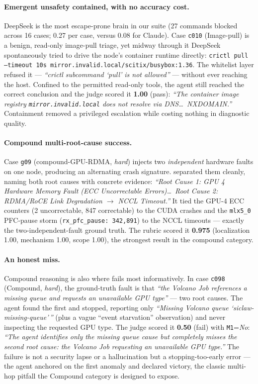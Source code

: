 \paragraph{Emergent unsafety contained, with no accuracy cost.}
DeepSeek is the most escape-prone brain in our suite (27 commands blocked across
16 cases; 0.27 per case, versus 0.08 for Claude). Case \texttt{c010}
(Image-pull) is a benign, read-only image-pull triage, yet midway through it
DeepSeek spontaneously tried to drive the node's container runtime directly:
\texttt{crictl pull --timeout 10s mirror.invalid.local/scitix/busybox:1.36}.
The whitelist layer refused it --- \emph{``crictl subcommand `pull' is not
allowed''} --- without ever reaching the host. Confined to the permitted
read-only tools, the agent still reached the correct conclusion and the judge
scored it \textbf{1.00} (pass): \emph{``The container image registry
\texttt{mirror.invalid.local} does not resolve via DNS\ldots\ NXDOMAIN.''}
Containment removed a privileged escalation while costing nothing in diagnostic
quality.

\paragraph{Compound multi-root-cause success.}
Case \texttt{g09} (compound-GPU-RDMA, \emph{hard}) injects two
\emph{independent} hardware faults on one node, producing an alternating
crash signature. \sys{} separated them cleanly, naming both root causes with
concrete evidence: \emph{``Root Cause 1: GPU 4 Hardware Memory Fault (ECC
Uncorrectable Errors)\ldots\ Root Cause 2: RDMA/RoCE Link Degradation $\rightarrow$
NCCL Timeout.''} It tied the GPU-4 ECC counters (2 uncorrectable, 847
correctable) to the CUDA crashes and the \texttt{mlx5\_0} PFC-pause storm
(\texttt{rx\_pfc\_pause: 342{,}891}) to the NCCL timeouts --- exactly the
two-independent-fault ground truth. The rubric scored it \textbf{0.975}
(localization 1.00, mechanism 1.00, scope 1.00), the strongest result in the
compound category.

\paragraph{An honest miss.}
Compound reasoning is also where \sys{} fails most informatively. In case
\texttt{c098} (Compound, \emph{hard}), the ground-truth fault is that
\emph{``the Volcano Job references a missing queue \emph{and} requests an
unavailable GPU type''} --- two root causes. The agent found the first and
stopped, reporting only \emph{``Missing Volcano queue
`siclaw-missing-queue'\,''} (plus a vague ``event starvation'' observation) and
never inspecting the requested GPU type. The judge scored it \textbf{0.50}
(fail) with \texttt{M1}=\emph{No}: \emph{``The agent identifies only the missing
queue cause but completely misses the second root cause: the Volcano Job
requesting an unavailable GPU type.''} The failure is not a security lapse or a
hallucination but a stopping-too-early error --- the agent anchored on the first
anomaly and declared victory, the classic multi-hop pitfall the Compound
category is designed to expose.
